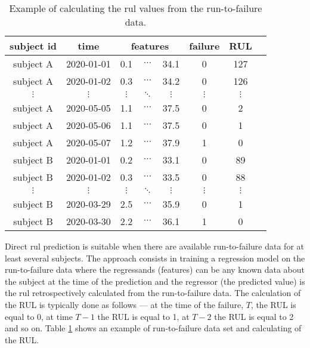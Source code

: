\begin{table}
	\centering
	\begin{tabular}{|c|c|ccc|c|c|c|}
    \hline
    subject id
    & time
    & \multicolumn{3}{|p{3cm}|}{\centering features}
    & failure
    & \textbf{RUL}\\
    \hline
    subject A & 2020-01-01 &          0.1 & $\cdots$ &  34.1 & 0 & 127\\
	subject A & 2020-01-02 &          0.3 & $\cdots$ &  34.2 & 0 & 126\\
    $\vdots$ & $\vdots$ & $\vdots$ & $\ddots$ & $\vdots$ & $\vdots$ & $\vdots$\\
    subject A & 2020-05-05 &          1.1 & $\cdots$ &  37.5 & 0 & 2\\
    subject A & 2020-05-06 &          1.1 & $\cdots$ &  37.5 & 0 & 1\\
    subject A & 2020-05-07 &          1.2 & $\cdots$ &  37.9 & 1 & 0\\
    \hdashline
    subject B & 2020-01-01 &          0.2 & $\cdots$ &  33.1 & 0 & 89\\
    subject B & 2020-01-02 &          0.3 & $\cdots$ &  33.5 & 0 & 88\\
    $\vdots$ & $\vdots$ & $\vdots$ & $\ddots$ & $\vdots$ & $\vdots$ & $\vdots$\\
    subject B & 2020-03-29 &          2.5 & $\cdots$ &  35.9 & 0 & 1\\
    subject B & 2020-03-30 &          2.2 & $\cdots$ &  36.1 & 1 & 0\\
    \hline
	\end{tabular}
    \caption{Example of calculating the \acrshort{rul} values from the run-to-failure data.}
    \label{tab:pdm_data_run_to_failure}
\end{table}

Direct \acrshort{rul} prediction is suitable when there are available run-to-failure data for at least several subjects.
The approach consists in training a regression model on the run-to-failure data where the regressands (features) can be any known data about the subject at the time of the prediction and the regressor (the predicted value) is the \acrshort{rul} retrospectively calculated from the run-to-failure data.
The calculation of the RUL is typically done as follows --- at the time of the failure, $T$, the RUL is equal to 0, at time $T-1$ the RUL is equal to 1, at $T-2$ the RUL is equal to 2 and so on.
Table \ref{tab:pdm_data_run_to_failure} shows an example of run-to-failure data set and calculating of the RUL.

